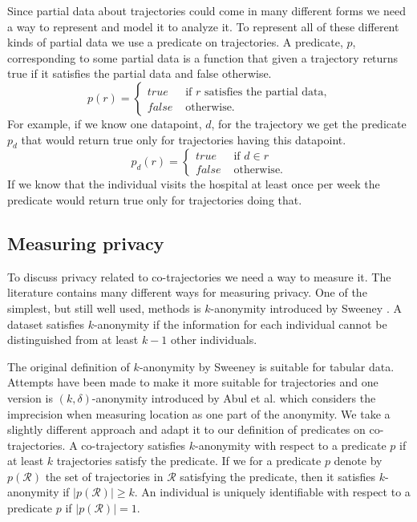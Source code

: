 \documentclass[12pt]{article}
\newcommand{\data}{d}
\newcommand{\traj}{r}
\newcommand{\cotraj}{\mathcal{R}}
\newcommand{\pred}{p}
\theoremstyle{definition}
\begin{document}
Since partial data about trajectories could come in many different
forms we need a way to represent and model it to analyze it. To
represent all of these different kinds of partial data we use a
predicate on trajectories. A predicate, \(\pred\), corresponding to
some partial data is a function that given a trajectory returns true
if it satisfies the partial data and false otherwise.
\begin{equation*}
  \pred(\traj) =
  \begin{cases}
    true & \text{ if } \traj \text{ satisfies the partial data,}\\
    false & \text{ otherwise.}
  \end{cases}
\end{equation*}
For example, if we know one datapoint, \(\data\), for the trajectory
we get the predicate \(\pred_{\data}\) that would return true only for
trajectories having this datapoint.
\begin{equation*}
  \pred_{\data}(\traj) =
  \begin{cases}
    true & \text{ if } \data \in \traj\\
    false & \text{ otherwise.}
  \end{cases}
\end{equation*}
If we know that the individual visits the hospital at least once per
week the predicate would return true only for trajectories doing that.

\subsection{Measuring privacy}
\label{sec:measuring-privacy}
To discuss privacy related to co-trajectories we need a way to measure
it. The literature contains many different ways for measuring privacy.
One of the simplest, but still well used, methods is \(k\)-anonymity
introduced by Sweeney \cite{sweeney_k-anonymity:_2002}. A dataset
satisfies \(k\)-anonymity if the information for each individual
cannot be distinguished from at least \(k - 1\) other individuals.

The original definition of \(k\)-anonymity by Sweeney is suitable for
tabular data. Attempts have been made to make it more suitable for
trajectories and one version is \((k, \delta)\)-anonymity introduced
by Abul et al. \cite{abul_never_2008} which considers the imprecision
when measuring location as one part of the anonymity. We take a
slightly different approach and adapt it to our definition of
predicates on co-trajectories. A co-trajectory satisfies
\(k\)-anonymity with respect to a predicate \(\pred\) if at least
\(k\) trajectories satisfy the predicate. If we for a predicate
\(\pred\) denote by \(\pred(\cotraj)\) the set of trajectories in
\(\cotraj\) satisfying the predicate, then it satisfies
\(k\)-anonymity if \(|\pred(\cotraj)| \geq k\). An individual is
uniquely identifiable with respect to a predicate \(\pred\) if
\(|\pred(\cotraj)| = 1\).
\end{document}
